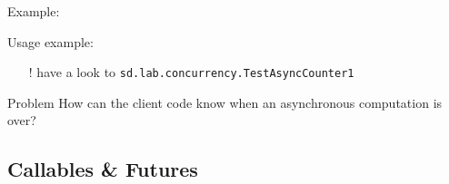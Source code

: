 \documentclass[presentation]{beamer}\mode<presentation>{\usetheme{AMSBolognaFC}}
\begin{document}
\begin{frame}[allowframebreaks]
    \framebreak

    Example:
	

    \framebreak

    Usage example:
    
    \begin{itemize}
        \item[!] have a look to \texttt{sd.lab.concurrency.\alert{TestAsyncCounter1}}
    \end{itemize}

%

    \framebreak

    \begin{alertblock}{Problem}\centering
        How can the client code know when an asynchronous computation is over?
    \end{alertblock}

\end{frame}

\subsection{Callables \& Futures}
\end{document}
